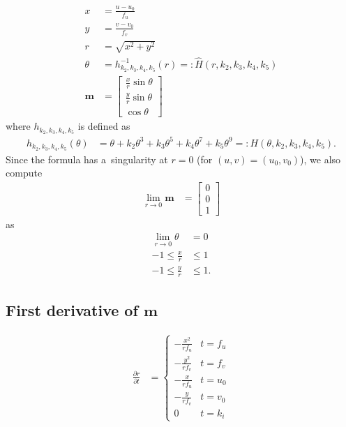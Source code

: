 \documentclass[12pt,a4paper]{amsart}
\renewcommand{\v}[1]{\mathbf{#1}}
\newcommand{\ddd}[2]{\frac{\partial #1}{\partial #2}}
\begin{document}
\begin{align*}
  x & = \frac{u - u_0}{f_u} \\
  y & = \frac{v - v_0}{f_v} \\
  r & = \sqrt{x^2 + y^2} \\
  \theta & = h_{k_2, k_3, k_4, k_5}^{-1}(r) =: \hat{H}(r, k_2, k_3, k_4, k_5) \\
  \v{m} & = \left[ \begin{array}{c} \frac{x}{r}\sin\theta \\ \frac{y}{r}\sin\theta \\ \cos\theta \end{array} \right]
\end{align*}
where $h_{k_2, k_3, k_4, k_5}$ is defined as
\begin{align*}
  h_{k_2, k_3, k_4, k_5}(\theta) & = \theta + k_2\theta^3 + k_3\theta^5 + k_4\theta^7 + k_5\theta^9 =: H(\theta, k_2, k_3, k_4, k_5).
\end{align*}
Since the formula has a~singularity at $r = 0$ (for $(u, v) = (u_0, v_0)$), we also compute
\begin{align*}
  \lim_{r \to 0} \v{m} & = \left[ \begin{array}{c} 0 \\ 0 \\ 1 \end{array} \right]
\end{align*}
as
\begin{align*}
  \lim_{r \to 0} \theta & = 0 \\
  -1 \leq \frac{x}{r} & \leq 1 \\
  -1 \leq \frac{y}{r} & \leq 1.
\end{align*}

\subsection{First derivative of $\v{m}$}

\begin{align*}
  \ddd{r}{t} & =
    \begin{cases}
      -\frac{x^2}{rf_u}      & t = f_u \\
      -\frac{y^2}{rf_v}      & t = f_v \\
      -\frac{x}{rf_u}        & t = u_0 \\
      -\frac{y}{rf_v}        & t = v_0 \\
      0                      & t = k_i
    \end{cases}
\end{align*}
\end{document}
